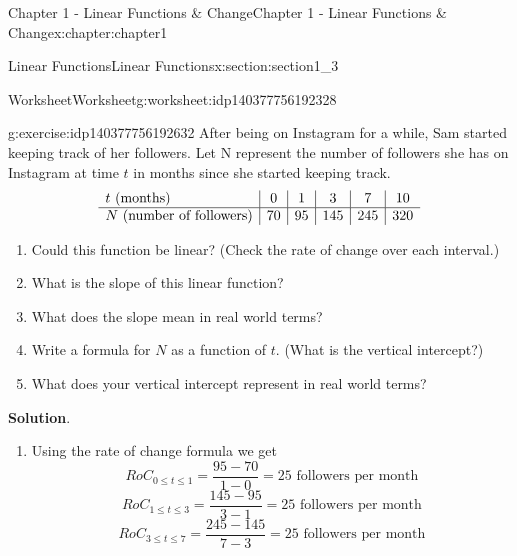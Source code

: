\documentclass[oneside,10pt,]{book}
\newcommand{\blocktitlefont}{\relax}
\begin{document}
\begin{chapterptx}{Chapter 1 - Linear Functions \& Change}{}{Chapter 1 - Linear Functions \& Change}{}{}{x:chapter:chapter1}
\begin{sectionptx}{Linear Functions}{}{Linear Functions}{}{}{x:section:section1_3}
\begin{tcbraster}[raster columns=2, raster column skip=1pt, raster halign=center, raster force size=false, raster left skip=0pt, raster right skip=0pt]
\end{tcbraster}%
%
%
\typeout{************************************************}
\typeout{************************************************}
%
\begin{worksheet-subsection}{Worksheet}{}{Worksheet}{}{}{g:worksheet:idp140377756192328}
\begin{divisionexercise}{1}{}{}{g:exercise:idp140377756192632}%
After being on Instagram for a while, Sam started keeping track of her followers. Let N represent the number of followers she has on Instagram at time \(t\) in months since she started keeping track.%
\begin{equation*}
\begin{array} { l | c | c | c | c | c }
t \text{ (months)} & 0 & 1 & 3 & 7 & 10 \\
\hline N \text{ (number of followers)} & 70 & 95 & 145 & 245 & 320
\end{array} 
\end{equation*}
%
\begin{enumerate}[label=(\alph*)]
\item{}Could this function be linear? (Check the rate of change over each interval.)%
\item{}What is the slope of this linear function?%
\item{}What does the slope mean in real world terms?%
\item{}Write a formula for \(N\) as a function of \(t\). (What is the vertical intercept?)%
\item{}What does your vertical intercept represent in real world terms?%
\end{enumerate}
\textbf{\blocktitlefont Solution}.\hypertarget{g:solution:idp140377756198040}{}\quad{}%
\begin{enumerate}[label=(\alph*)]
\item{}Using the rate of change formula we get%
%
\begin{equation*}
RoC_{0\leq t \leq 1} = \frac{95-70}{1-0} = 25 \text{ followers per month}
\end{equation*}
%
\begin{equation*}
RoC_{1\leq t \leq 3} = \frac{145-95}{3-1} = 25 \text{ followers per month}
\end{equation*}
%
\begin{equation*}
RoC_{3\leq t \leq 7} = \frac{245-145}{7-3} = 25 \text{ followers per month}
\end{equation*}

\end{enumerate}
\end{divisionexercise}
\end{worksheet-subsection}
\end{sectionptx}
\end{chapterptx}
\end{document}
